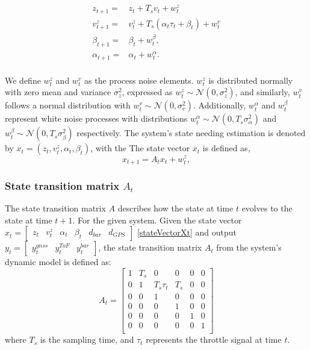 \documentclass{article}
\begin{document}
    \begin{align}
        z_{t+1} =& z_t + {T_s}{v_t} + w^{z}_{t}\\
        v_{t+1}^z =& v_t^z + T_s (\alpha_t \tau_t + \beta_t) + w_t^v\\
        \beta_{t+1} {}={} & \beta_t + w^\beta_t,\\
        \alpha_{t+1} {}={} & \alpha_t + w^\alpha_t.\\
    \end{align}

    We define $w_t^z$ and $w_t^v$ as the process noise elements. $w_t^z$ is
    distributed normally with zero mean and variance $\sigma_z^2$, expressed as
    $w_t^z \sim \mathcal{N}(0, \sigma_z^2)$, and similarly, $w_t^v$ follows a
    normal distribution with $w_t^v \sim \mathcal{N}(0, \sigma_v^2)$.
    Additionally, $w_t^\alpha$ and $w_t^\beta$ represent white noise processes
    with distributions $w_t^\alpha \sim \mathcal{N}(0, T_s \sigma_\alpha^2)$ and
    $w_t^\beta \sim \mathcal{N}(0, T_s \sigma_\beta^2)$ respectively. The
    system's state needing estimation is denoted by $x_t = (z_t, v_t^z,
    \alpha_t, \beta_t)$, with the The state vector \( x_t \) is defined as,
    \begin{equation}
        x_{t+1} = A_t x_t + w_t^z,
    \end{equation}

    \subsubsection*{State transition matrix \( A_t \)}
    The state transition matrix \( A \) describes how the state at time \( t \)
    evolves to the state at time \( t+1 \). For the given system. Given the
    state vector \( x_t = \begin{bmatrix} z_t&  v_t^z&  \alpha_t&  \beta_t&
    d_{bar}& d_{GPS} \end{bmatrix} \) \eqref{stateVectorXt} and output \(y_t =
    \begin{bmatrix} y^{gnss}_t & y^{ToF}_t& y^{bar}_t \end{bmatrix} \), the
    state transition matrix \( A_t \) from the system's dynamic model is defined
    as:
    \begin{equation}
    A_t = 
    \begin{bmatrix}
    1 & T_s & 0 & 0 & 0 & 0\\
    0 & 1 & T_s \tau_t & T_s & 0 & 0\\
    0 & 0 & 1 & 0 & 0 & 0 \\
    0 & 0 & 0 & 1 & 0 & 0 \\
    0 & 0 & 0 & 0 & 1 & 0 \\
    0 & 0 & 0 & 0 & 0 & 1 \\
    \end{bmatrix}
    \end{equation}
    where \( T_s \) is the sampling time, and \( \tau_t \) represents the
    throttle signal at time \( t \).
  
\end{document}
